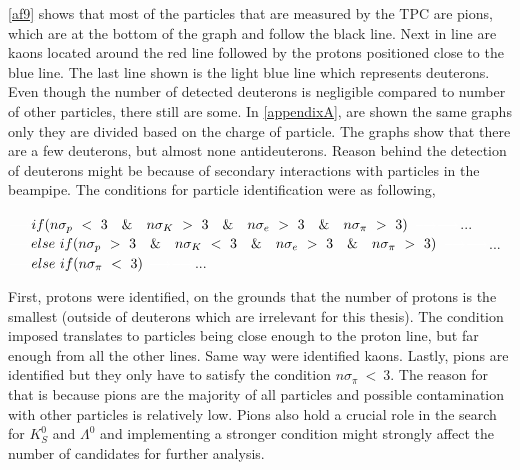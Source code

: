 \FloatBarrier
\autoref{af9} shows that most of the particles that are measured by the TPC are pions, which are at the bottom of the graph and follow the black line. Next in line are kaons located around the red line followed by the protons positioned close to the blue line. The last line shown is the light blue line which represents deuterons. Even though the number of detected deuterons is negligible compared to number of other particles, there still are some. In \autoref{appendixA}, are shown the same graphs only they are divided based on the charge of particle. The graphs show that there are a few deuterons, but almost none antideuterons. Reason behind the detection of deuterons might be because of secondary interactions with particles in the beampipe.
\newline
The conditions for particle identification were as following,
\newline
\newline
\begin{minipage}{15cm}
\begin{myblock}{}
\centering
        $\textcolor{white}{\longrightarrow}if(n\sigma_{p}~<~3 ~~~\& ~~~n\sigma_{K}~>~3 ~~~\& ~~~n\sigma_{e}~>~3~~~ \& ~~~n\sigma_{\pi}~>~3)$
    \newline
    $\textcolor{white}{\longrightarrow}\textcolor{white}{\longrightarrow}$...
    \newline
        $\textcolor{white}{\longrightarrow}else~if(n\sigma_{p}~>~3 ~~~\& ~~~n\sigma_{K}~<~3 ~~~\& ~~~n\sigma_{e}~>~3~~~ \& ~~~n\sigma_{\pi}~>~3)$
    \newline
    $\textcolor{white}{\longrightarrow}\textcolor{white}{\longrightarrow}$...
    \newline
        $\textcolor{white}{\longrightarrow}else~if(n\sigma_{\pi}~<~3)$
    \newline
    $\textcolor{white}{\longrightarrow}\textcolor{white}{\longrightarrow}$...
\end{myblock}
\end{minipage}
\newline
\newline
First, protons were identified, on the grounds that the number of protons is the smallest (outside of deuterons which are irrelevant for this thesis). The condition imposed translates to particles being close enough to the proton line, but far enough from all the other lines. Same way were identified kaons. Lastly, pions are identified but they only have to satisfy the condition $n \sigma_{\pi}~<~3$. The reason for that is because pions are the majority of all particles and possible contamination with other particles is relatively low. Pions also hold a crucial role in the search for $K^0_S$ and $\Lambda^0$ and implementing a stronger condition might strongly affect the number of candidates for further analysis.
